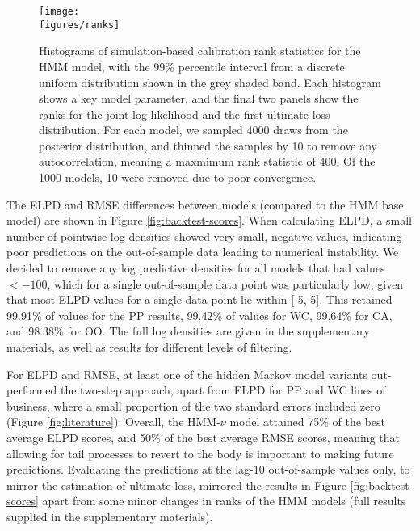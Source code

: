 \begin{figure}
    \centering
    \texttt{[image: \\figures/ranks]}
    \caption{
		Histograms of simulation-based calibration
		rank statistics for the HMM model, 
        with the 99\% percentile
        interval from a discrete uniform distribution
        shown in the grey shaded band.
        Each histogram shows a key model parameter,
        and the final two panels show the ranks
        for the joint log
        likelihood and the first ultimate loss
        distribution.
        For each model, we sampled
        4000 draws from the posterior distribution,
        and thinned the samples by 10 to remove any
        autocorrelation, meaning a maxmimum rank statistic
        of 400. Of the 1000 models,
        10 were removed due to poor convergence.
    }
	\label{fig:sbc}
\end{figure}

The ELPD and RMSE differences between models (compared to the
HMM base model) are shown in Figure \ref{fig:backtest-scores}.
When calculating ELPD, a small number of pointwise log densities 
showed very small, negative values, indicating poor predictions
on the out-of-sample data leading to numerical instability. 
We decided to remove any log predictive
densities for all models that had values $< -100$, which for a single
out-of-sample data point was particularly low, given that most
ELPD values for a single data point lie within [-5, 5]. This retained 99.91\%
of values for the PP results, 99.42\% of values for WC, 99.64\%
for CA, and 98.38\% for OO. The full log densities are given in the
supplementary materials, as well as results for different levels
of filtering.

For ELPD and RMSE, at least one of the
hidden Markov model variants out-performed
the two-step approach, apart from ELPD
for PP and WC lines of business, where
a small proportion of the
two standard errors 
included zero (Figure \ref{fig:literature}).
Overall, the HMM-$\nu$ model attained
75\% of the best average ELPD scores, and 50\%
of the best average RMSE scores, meaning that
allowing for tail processes to revert
to the body is important to making
future predictions.
Evaluating the predictions at the lag-10
out-of-sample values only, to mirror
the estimation of ultimate loss,
mirrored the results in Figure
\ref{fig:backtest-scores} apart from some
minor changes in ranks of the HMM
models (full results supplied
in the supplementary materials).

